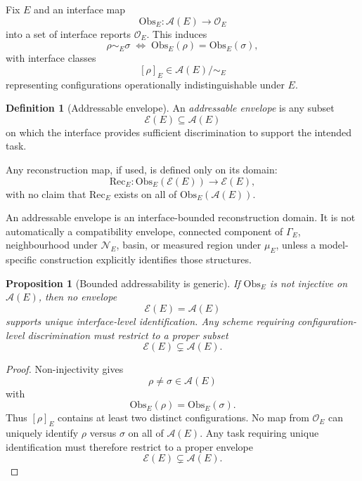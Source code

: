 \documentclass[aps,prx,onecolumn,11pt]{revtex4-2}
\theoremstyle{plain}
\newtheorem{proposition}{Proposition}
\theoremstyle{definition}
\newtheorem{definition}{Definition}
\theoremstyle{remark}
\begin{document}
Fix \(E\) and an interface map
\[
\mathrm{Obs}_E :
\mathcal{A}(E)
\to
\mathcal{O}_E
\]
into a set of interface reports \(\mathcal{O}_E\). This induces
\begin{equation}
\rho \sim_E \sigma
\;\Longleftrightarrow\;
\mathrm{Obs}_E(\rho)=\mathrm{Obs}_E(\sigma),
\label{eq:simE_obs}
\end{equation}
with interface classes
\[
[\rho]_E\in \mathcal{A}(E)/{\sim_E}
\]
representing configurations operationally indistinguishable under
\(E\).

\begin{definition}[Addressable envelope]
\label{def:addressable_envelope}
An \emph{addressable envelope} is any subset
\[
\mathcal{E}(E)\subseteq\mathcal{A}(E)
\]
on which the interface provides sufficient discrimination to support
the intended task.

Any reconstruction map, if used, is defined only on its domain:
\[
\mathrm{Rec}_E :
\mathrm{Obs}_E(\mathcal{E}(E))
\to
\mathcal{E}(E),
\]
with no claim that \(\mathrm{Rec}_E\) exists on all of
\(\mathrm{Obs}_E(\mathcal{A}(E))\).
\end{definition}

An addressable envelope is an interface-bounded reconstruction domain.
It is not automatically a compatibility envelope, connected component
of \(\Gamma_E\), neighbourhood under \(\mathcal N_E\), basin, or
measured region under \(\mu_E\), unless a model-specific construction
explicitly identifies those structures.

\begin{proposition}[Bounded addressability is generic]
\label{prop:bounded_addressability_generic}
If \(\mathrm{Obs}_E\) is not injective on \(\mathcal{A}(E)\), then no
envelope
\[
\mathcal{E}(E)=\mathcal{A}(E)
\]
supports unique interface-level identification. Any scheme requiring
configuration-level discrimination must restrict to a proper subset
\[
\mathcal{E}(E)\subsetneq\mathcal{A}(E).
\]
\end{proposition}

\begin{proof}
Non-injectivity gives
\[
\rho\neq\sigma\in\mathcal{A}(E)
\]
with
\[
\mathrm{Obs}_E(\rho)=\mathrm{Obs}_E(\sigma).
\]
Thus \([\rho]_E\) contains at least two distinct configurations. No map
from \(\mathcal{O}_E\) can uniquely identify \(\rho\) versus \(\sigma\)
on all of \(\mathcal{A}(E)\). Any task requiring unique identification
must therefore restrict to a proper envelope
\[
\mathcal{E}(E)\subsetneq\mathcal{A}(E).
\]
\end{proof}
\end{document}
